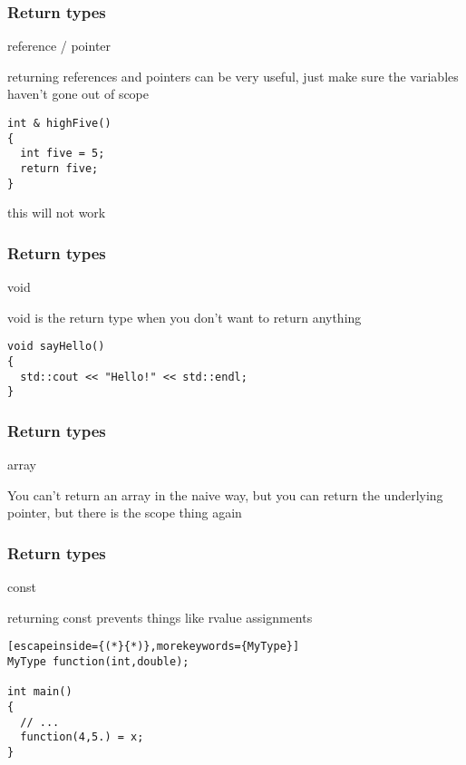 \documentclass[14pt,a4paper,dvipsnames,usenames]{beamer}
\begin{document}
\begin{frame}[fragile]
  \frametitle{Return types}

  \vspace{.5em}
  {\fontsize{18}{18}\selectfont{}\color{FeebleWeek}reference / pointer}

  \vspace{.5em}
  returning references and pointers can be very useful, just make sure the variables haven't gone out of scope

  \vspace{.5em}
  \begin{lstlisting}
int & highFive()
{
  int five = 5;
  return five;
}
  \end{lstlisting}

  \vspace{.5em}
  this will not work
  
\end{frame}

\begin{frame}[fragile]
  \frametitle{Return types}

  \vspace{.5em}
  {\fontsize{18}{18}\selectfont{}\color{FeebleWeek}void}

  \vspace{1em}
  void is the return type when you don't want to return anything

  \vspace{.5em}
  \begin{lstlisting}
void sayHello()
{
  std::cout << "Hello!" << std::endl;
}
  \end{lstlisting}


\end{frame}

\begin{frame}[fragile]
  \frametitle{Return types}

  \vspace{.5em}
  {\fontsize{18}{18}\selectfont{}\color{FeebleWeek}array}

  \vspace{1em}
  You can't return an array in the naive way, but you can return the underlying pointer, but there is the scope thing
  again

\end{frame}

\begin{frame}[fragile]
  \frametitle{Return types}

  \vspace{.5em}
  {\fontsize{18}{18}\selectfont{}\color{FeebleWeek}const}

  \vspace{.5em}
  returning const prevents things like rvalue assignments
  
  \vspace{.5em}
  \begin{lstlisting}[escapeinside={(*}{*)},morekeywords={MyType}]
MyType function(int,double);

int main()
{
  // ...
  function(4,5.) = x;
}
  \end{lstlisting}

\end{frame}
\end{document}
